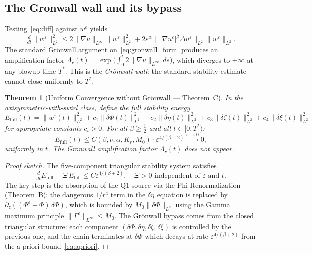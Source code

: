 \documentclass[11pt]{article}
\newtheorem{theorem}{Theorem}[section]
\newcommand{\eps}{\varepsilon}
\newcommand{\norm}[2]{\|{#1}\|_{#2}}
\newcommand{\ddt}{\tfrac{d}{dt}}
\begin{document}
\subsection{The Gronwall wall and its bypass}

Testing~\eqref{eq:diff} against $w^\eps$ yields
\begin{equation}\label{eq:gronwall_form}
  \ddt\norm{w^\eps}{L^2}^2
  \le 2\norm{\nabla u}{L^\infty}\norm{w^\eps}{L^2}^2
  + 2\eps^\alpha\norm{|\nabla u^\eps|^\beta\Delta u^\eps}{L^2}
    \norm{w^\eps}{L^2}.
\end{equation}
The standard Gr\"onwall argument on~\eqref{eq:gronwall_form}
produces an amplification factor
$\Lambda_r(t) = \exp\!\bigl(\int_0^t 2\norm{\nabla u}{L^\infty}\,ds\bigr)$,
which diverges to $+\infty$ at any blowup time $T^*$.
This is the \emph{Gr\"onwall wall}: the standard stability
estimate cannot close uniformly to $T^*$.

\begin{theorem}[Uniform Convergence without Gr\"onwall --- Theorem~C]
\label{thm:C}
In the axisymmetric-with-swirl class, define the full stability energy
\[
  E_{\mathrm{full}}(t)
  = \norm{w^\eps(t)}{L^2}^2
  + c_1\norm{\delta\Phi(t)}{L^2}^2
  + c_2\norm{\delta\eta(t)}{L^2}^2
  + c_3\norm{\delta\zeta(t)}{L^2}^2
  + c_4\norm{\delta\xi(t)}{L^2}^2
\]
for appropriate constants $c_i>0$.
For all $\beta\ge\tfrac12$ and all $t\in[0,T^*)$:
\begin{equation}\label{eq:uniform_conv}
  E_{\mathrm{full}}(t)
  \le C(\beta,\nu,\alpha,K_r,M_0)\cdot\eps^{4/(\beta+2)}
  \xrightarrow{\eps\to0} 0,
\end{equation}
uniformly in $t$. The Gr\"onwall amplification factor $\Lambda_r(t)$
does not appear.
\end{theorem}

\begin{proof}[Proof sketch]
The five-component triangular stability system satisfies
\[
  \ddt E_{\mathrm{full}} + \Xi\,E_{\mathrm{full}}
  \le C\eps^{4/(\beta+2)},
  \quad \Xi>0\text{ independent of }\eps\text{ and }t.
\]
The key step is the absorption of the Q1 source via the
Phi-Renormalization (Theorem~B): the dangerous $1/r^4$ term
in the $\delta\eta$ equation is replaced by
$\partial_z((\Phi^\eps+\Phi)\,\delta\Phi)$,
which is bounded by $M_0\norm{\delta\Phi}{L^2}$ using the
Gamma maximum principle $\norm{\Gamma^\eps}{L^\infty}\le M_0$.
The Gr\"onwall bypass comes from the closed triangular structure:
each component $(\delta\Phi,\delta\eta,\delta\zeta,\delta\xi)$
is controlled by the previous one, and the chain terminates at
$\delta\Phi$ which decays at rate $\eps^{4/(\beta+2)}$
from the a priori bound~\eqref{eq:apriori}.
\end{proof}
\end{document}
